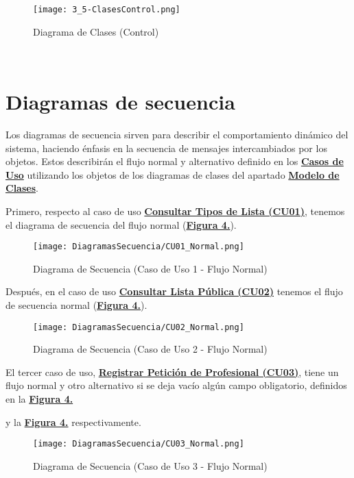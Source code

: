 \begin{landscape}
  \label{fig:ClasesControl}
  \vspace*{\fill}
  \begin{figure}[!htbp]
    \centering
    \texttt{[image: 3\_5-ClasesControl.png]}
    \caption{Diagrama de Clases (Control)}
  \end{figure}
  \vfill
\end{landscape}
\FloatBarrier

\newpage~
\section{Diagramas de secuencia}
Los diagramas de secuencia sirven para describir el comportamiento dinámico del sistema, haciendo énfasis en la secuencia de mensajes intercambiados por los objetos. Estos describirán el flujo normal y alternativo definido en los \textbf{\hyperref[cu]{Casos de Uso}} utilizando los objetos de los diagramas de clases del apartado \textbf{\hyperref[mc]{Modelo de Clases}}. \\


\addtocounter{figura_cap4}{1}
Primero, respecto al caso de uso \textbf{\hyperref[tab:cuuConsultaTiposLst]{Consultar Tipos de Lista (CU01)}}, tenemos el diagrama de secuencia del flujo normal (\textbf{\hyperref[fig:Secuencia_CU1_Normal]{Figura 4.}}).
\begin{figure}[!htbp]
  \centering
  \texttt{[image: DiagramasSecuencia/CU01\_Normal.png]}
  \caption{Diagrama de Secuencia (Caso de Uso 1 - Flujo Normal)}
  \label{fig:Secuencia_CU1_Normal}
\end{figure}
\FloatBarrier

\addtocounter{figura_cap4}{1}
Después, en el caso de uso \textbf{\hyperref[tab:cuuConsultaLstPub]{Consultar Lista Pública (CU02)}} tenemos el flujo de secuencia normal (\textbf{\hyperref[fig:Secuencia_CU2_Normal]{Figura 4.}}).
\begin{landscape}
  \label{fig:Secuencia_CU2_Normal}
  \vspace*{\fill}
  \begin{figure}[!htbp]
    \centering
    \texttt{[image: DiagramasSecuencia/CU02\_Normal.png]}
    \caption{Diagrama de Secuencia (Caso de Uso 2 - Flujo Normal)}
  \end{figure}
  \vfill
\end{landscape}
\FloatBarrier

\addtocounter{figura_cap4}{1}
El tercer caso de uso, \textbf{\hyperref[tab:cuuRegPeticProf]{Registrar Petición de Profesional (CU03)}}, tiene un flujo normal y otro alternativo si se deja vacío algún campo obligatorio, definidos en la \textbf{\hyperref[fig:Secuencia_CU3_Normal]{Figura 4.}}\addtocounter{figura_cap4}{1} y la \textbf{\hyperref[fig:Secuencia_CU3_Alt1]{Figura 4.}} respectivamente.
\begin{figure}[!htbp]
  \centering
  \texttt{[image: DiagramasSecuencia/CU03\_Normal.png]}
  \caption{Diagrama de Secuencia (Caso de Uso 3 - Flujo Normal)}
  \label{fig:Secuencia_CU3_Normal}
\end{figure}
\FloatBarrier

